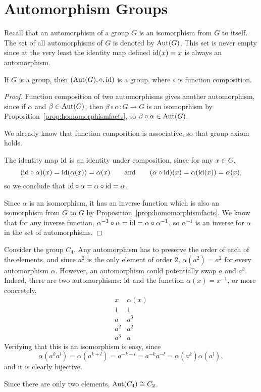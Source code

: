 \section{Automorphism Groups}

Recall that an automorphism of a group $G$ is an isomorphism from $G$ to
itself.  The set of all automorphisms of $G$ is denoted by $\operatorname{Aut}(G)$.  This
set is never empty since at the very least the identity map defined $\text{id}(x)
= x$ is always an automorphism.

\begin{proposition}
  If $G$ is a group, then $(\operatorname{Aut}(G), \circ, \text{id})$ is a group, where $\circ$
  is function composition.
\end{proposition}
\begin{proof}
  Function composition of two automorphisms gives another automorphism, since
  if $\alpha$ and $\beta \in \operatorname{Aut}(G)$, then $\beta \circ \alpha: G \to G$ is
  an isomoprhism by Proposition~\ref{prop:homomorphismfacts}, so
  $\beta \circ \alpha \in \operatorname{Aut}(G)$.
  
  We already know that function composition is associative, so that group
  axiom holds.
  
  The identity map $\text{id}$ is an identity under composition, since for any
  $x \in G$,
  \[
    (\text{id} \circ \alpha)(x) = \text{id}(\alpha(x)) = \alpha(x) \qquad \text{and}
    \qquad (\alpha \circ \text{id})(x) = \alpha(\text{id}(x)) = \alpha(x),
  \]
  so we conclude that $\text{id} \circ \alpha = \alpha \circ \text{id} = \alpha$.
  
  Since $\alpha$ is an isomorphism, it has an inverse function which is also
  an isomorphism from $G$ to $G$ by Proposition~\ref{prop:homomorphismfacts}.
  We know that for any inverse function, $\alpha^{-1} \circ \alpha = \text{id} =
  \alpha \circ \alpha^{-1}$, so $\alpha^{-1}$ is an inverse for $\alpha$ in
  the set of automorphisms.
\end{proof}

\begin{example}
  Consider the group $C_{4}$.  Any automorphism has to preserve the order of
  each of the elements, and since $a^{2}$ is the only element of order $2$,
  $\alpha(a^{2}) = a^{2}$ for every automorphism $\alpha$.  However, an
  automorphism could potentially swap $a$ and $a^{3}$.  Indeed, there are
  two automorphisms: $\text{id}$ and the function $\alpha(x) = x^{-1}$, or more
  concretely,
  \[
    \begin{array}{c|c}
      x & \alpha(x) \\
      \hline
      1 & 1\\
      a & a^{3}\\
      a^{2} & a^{2}\\
      a^{3} & a
    \end{array}
  \]
  Verifying that this is an isomorphism is easy, since
  \[
    \alpha(a^{k}a^{l}) = \alpha(a^{k+l}) = a^{-k-l} = a^{-k}a^{-l}
    = \alpha(a^{k})\alpha(a^{l}),
  \]
  and it is clearly bijective.
  
  Since there are only two elements, $\operatorname{Aut}(C_{4}) \cong C_{2}$.
\end{example}

